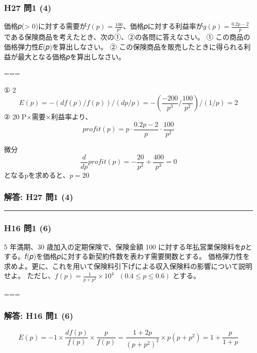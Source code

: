 \documentclass[
]{article}
\begin{document}
\hypertarget{h27-ux554f1-4}{%
\subsubsection{H27 問1 (4)}\label{h27-ux554f1-4}}

価格𝑝(\textgreater{}
0)に対する需要が\(f(p)=\frac{100}{p^2}\)、価格𝑝に対する利益率が\(g(p)=\frac{0.2p-2}{p}\)である保険商品を考えたとき、次の①、②の各問に答えなさい。
① この商品の価格弾力性𝐸(𝑝)を算出しなさい。 ②
この保険商品を販売したときに得られる利益が最大となる価格𝑝を算出しなさい。

===

① 2
\[ E(p) = -(df(p)/f(p)) / (dp/p) = -(\frac{-200}{p^3}/\frac{100}{p^2})/(1/p) = 2\]
② 20 P×需要×利益率より、
\[profit(p)=p\cdot\frac{0.2p-2}{p}\cdot\frac{100}{p^2}\]

微分 \[\frac{d}{dp} profit(p) = -\frac{20}{p^2}+\frac{400}{p^3}=0\]
となるpを求めると、\(p=20\)

\hypertarget{ux89e3ux7b54-h27-ux554f1-4}{%
\subsubsection{解答: H27 問1 (4)}\label{ux89e3ux7b54-h27-ux554f1-4}}

\begin{center}\rule{0.5\linewidth}{0.5pt}\end{center}

\hypertarget{h16-ux554f1-6}{%
\subsubsection{H16 問1 (6)}\label{h16-ux554f1-6}}

5 年満期、30 歳加入の定期保険で、保険金額 100
に対する年払営業保険料を𝑝とする。𝑓(𝑝)を価格𝑝に対する新契約件数を表わす需要関数とする。
価格弾力性を求めよ。更に、これを用いて保険料引下げによる収入保険料の影響について説明せよ。
ただし、\(f(p)=\frac{1}{p+p^2}\times 10^4\ \ \  (0.4\leq p \leq 0.6)\)
とする。

===

\hypertarget{ux89e3ux7b54-h16-ux554f1-6}{%
\subsubsection{解答: H16 問1 (6)}\label{ux89e3ux7b54-h16-ux554f1-6}}

\[E(p)=-1\times\frac{df(p)}{f(p)}\times\frac{p}{f(p)}
=\frac{1+2p}{(p+p^2)^2}\times p(p+p^2)
= 1 + \frac{p}{1+p}\]
\end{document}
